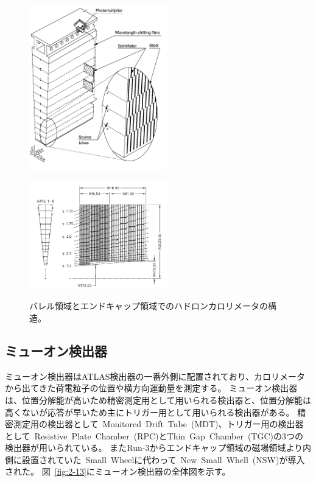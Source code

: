 \begin{figure}[h]
  \begin{minipage}[b]{0.45\linewidth}
      \centering
      \includegraphics[clip, width=6cm]{fig/2/TileCalo.png}
      \label{fig:2-12-1}
  \end{minipage}
    \begin{minipage}[b]{0.45\linewidth}
      \centering
      \includegraphics[clip, width=6cm]{fig/2/HadronEndcapCal.png}
      \label{fig:2-12-2}
  \end{minipage}
  \caption{バレル領域とエンドキャップ領域でのハドロンカロリメータの構造\cite{Aad:1129811}。}
\end{figure}


\subsection{ミューオン検出器}\label{section2-2-5}
ミューオン検出器はATLAS検出器の一番外側に配置されており、カロリメータから出てきた荷電粒子の位置や横方向運動量を測定する。
ミューオン検出器は、位置分解能が高いため精密測定用として用いられる検出器と、位置分解能は高くないが応答が早いため主にトリガー用として用いられる検出器がある。
精密測定用の検出器として~Monitored~Drift~Tube~(MDT)、トリガー用の検出器として~Resistive~Plate~Chamber~(RPC)とThin~Gap~Chamber~(TGC)の3つの検出器が用いられている。
またRun-3からエンドキャップ領域の磁場領域より内側に設置されていた~Small~Wheelに代わって~New~Small~Whell~(NSW)が導入された。
図~\ref{fig:2-13}にミューオン検出器の全体図を示す。

